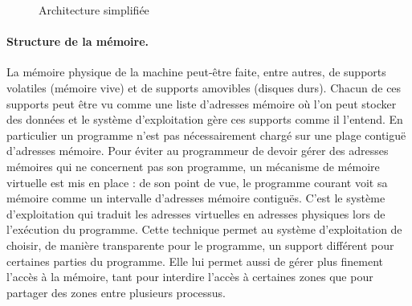 \begin{figure}[h]
\begin{center}
\end{center}
\caption{Architecture simplifiée}
\label{fig:arch_harvard_mod}
\end{figure}

\paragraph{Structure de la mémoire.}
La mémoire physique de la machine peut-être faite, entre autres, de supports volatiles (mémoire vive) et de supports amovibles (disques durs).
Chacun de ces supports peut être vu comme une liste d'adresses mémoire où l'on peut stocker des données et le système d'exploitation gère ces supports comme il l'entend.
En particulier un programme n'est pas nécessairement chargé sur une plage contiguë d'adresses mémoire.
Pour éviter au programmeur de devoir gérer des adresses mémoires qui ne concernent pas son programme, un mécanisme de mémoire virtuelle est mis en place : de son point de vue, le programme courant voit sa mémoire comme un intervalle d'adresses mémoire contiguës. C'est le système d'exploitation qui traduit les adresses virtuelles en adresses physiques lors de l'exécution du programme.
Cette technique permet au système d'exploitation de choisir, de manière transparente pour le programme, un support différent pour certaines parties du programme. Elle lui permet aussi de gérer plus finement l'accès à la mémoire, tant pour interdire l'accès à certaines zones que pour partager des zones entre plusieurs processus.

